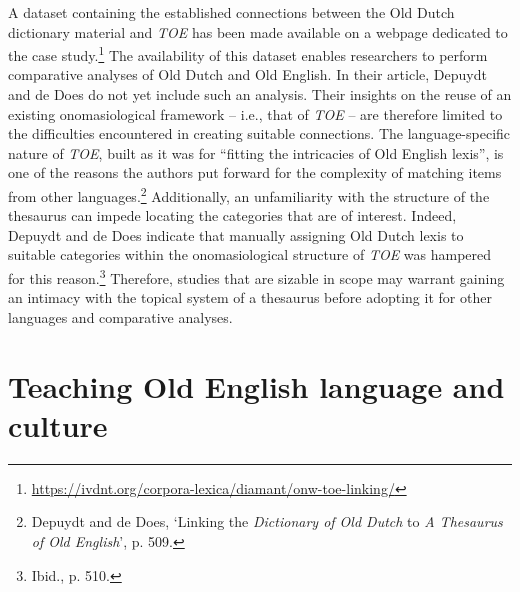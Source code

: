 A dataset containing the established connections between the Old Dutch dictionary material and \textit{TOE} has been made available on a webpage dedicated to the case study.\footnote{\url{https://ivdnt.org/corpora-lexica/diamant/onw-toe-linking/}} The availability of this dataset enables researchers to perform comparative analyses of Old Dutch and Old English. In their article, Depuydt and de Does do not yet include such an analysis. Their insights on the reuse of an existing onomasiological framework -- i.e., that of \textit{TOE} -- are therefore limited to the difficulties encountered in creating suitable connections. The language-specific nature of \textit{TOE}, built as it was for ``fitting the intricacies of Old English lexis'', is one of the reasons the authors put forward for the complexity of matching items from other languages.\footnote{Depuydt and de Does, `Linking the \textit{Dictionary of Old Dutch} to \textit{A Thesaurus of Old English}', p. 509.} Additionally, an unfamiliarity with the structure of the thesaurus can impede locating the categories that are of interest. Indeed, Depuydt and de Does indicate that manually assigning Old Dutch lexis to suitable categories within the onomasiological structure of \textit{TOE} was hampered for this reason.\footnote{Ibid., p. 510.} %
Therefore, studies that are sizable in scope may warrant gaining an intimacy with the topical system of a thesaurus before adopting it for other languages and comparative analyses.



\section{Teaching Old English language and culture}
\label{sect:Stolk2021x:cs-teaching}

